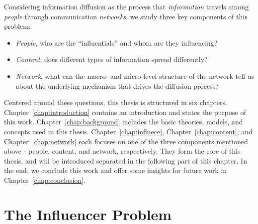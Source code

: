 \documentclass[phd,tocprelim]{cornell}
\begin{document}
Considering information diffusion as the process that \emph{information} travels among \emph{people} through communication \emph{networks}, we study three key components of this problem:

\begin{itemize}
\item \emph{People}, who are the ``influentials'' and whom are they influencing?
\item \emph{Content}, does different types of information spread differently? 
\item \emph{Network}, what can the macro- and micro-level structure of the network tell us about the underlying mechanism that drives the diffusion process?
\end{itemize}

Centered around these questions, this thesis is structured in six chapters. Chapter~\ref{chap:introduction} contains an introduction and states the purpose  of this work. Chapter~\ref{chap:background} includes the basic theories, models, and concepts used in this thesis. Chapter~\ref{chap:influece}, Chapter~\ref{chap:content}, and Chapter~\ref{chap:network} each focuses on one of the three components mentioned above - people, content, and network, respectively. They form the core of this thesis, and will be introduced separated in the following part of this chapter. In the end, we conclude this work and offer some insights for future work in Chapter~\ref{chap:conclusion}.   



\section{The Influencer Problem}

\end{document}
